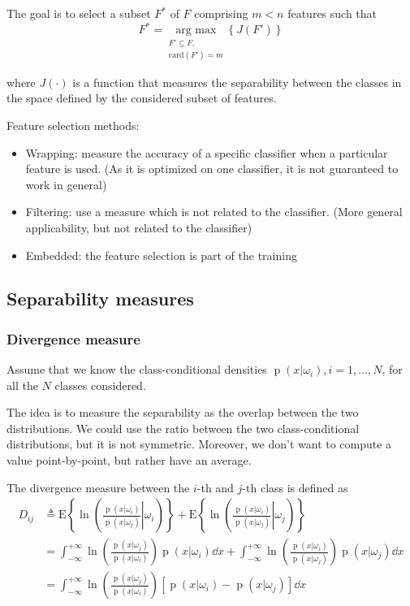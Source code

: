 \documentclass[oneside,onecolumn]{report}
\newcommand{\E}[1]{\text{E} \left\{ #1 \right\}}
\DeclareMathOperator*{\pdf}{p}
\begin{document}
The goal is to select a subset $F^*$ of $F$ comprising $m < n$ features such that
$$ F^* =\underset{\substack{ F' \subseteq F, \\  \text{card}(F') = m}}{\text{arg max}} \left\{ J(F') \right\} $$

where $J(\cdot)$ is a function that measures the separability between the classes in the space defined by the considered subset of features.

Feature selection methods:
\begin{itemize}
    \item Wrapping: measure the accuracy of a specific classifier when a particular feature is used. (As it is optimized on one classifier, it is not guaranteed to work in general)
    \item Filtering: use a measure which is not related to the classifier. (More general applicability, but not related to the classifier)
    \item Embedded: the feature selection is part of the training
\end{itemize}

\subsection{Separability measures}

\subsubsection{Divergence measure}
Assume that we know the class-conditional densities $\pdf(x | \omega_i), i = 1, \dots, N$, for all the $N$ classes considered.

The idea is to measure the separability as the overlap between the two distributions.
We could use the ratio between the two class-conditional distributions, but it is not symmetric.
Moreover, we don't want to compute a value point-by-point, but rather have an average.

The divergence measure between the $i$-th and $j$-th class is defined as
\begin{align*}
D_{i j}
&\triangleq \E{\ln( \left. \frac{\pdf(x | \omega_i)}{\pdf(x | \omega_j)} \right| \omega_i)} +
\E{\ln( \left. \frac{\pdf(x | \omega_i)}{\pdf(x | \omega_j)} \right| \omega_j)} \\
&= \int_{-\infty}^{+\infty} \ln( \frac{\pdf(x | \omega_j)}{\pdf(x | \omega_i)}) \pdf(x | \omega_i) \dd x + \int_{-\infty}^{+\infty} \ln( \frac{\pdf(x | \omega_i)}{\pdf(x | \omega_j)}) \pdf(x | \omega_j) \dd x \\
&= \int_{-\infty}^{+\infty} \ln( \frac{\pdf(x | \omega_j)}{\pdf(x | \omega_i)}) \left[ \pdf(x | \omega_i) - \pdf(x | \omega_j) \right] \dd x
\end{align*}
\end{document}
